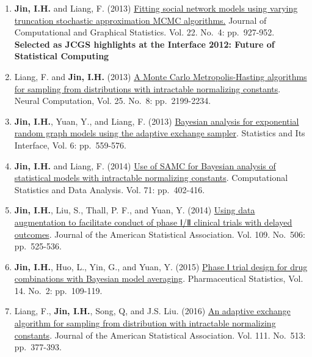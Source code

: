 \documentclass[
]{book}
\begin{document}
\begin{enumerate}
\def\labelenumi{\arabic{enumi}.}
\item
  \textbf{Jin, I.H.} and Liang, F. (2013) \href{https://www.researchgate.net/publication/241724330_Fitting_Social_Network_Models_Using_Varying_Truncation_Stochastic_Approximation_MCMC_Algorithm}{Fitting social network models using varying truncation stochastic approximation MCMC algorithms.} Journal of Computational and Graphical Statistics. Vol. 22. No.~4: pp.~927-952. \textbf{Selected as JCGS highlights at the Interface 2012: Future of Statistical Computing}
\item
  Liang, F. and \textbf{Jin, I.H.} (2013) \href{https://www.researchgate.net/publication/236264661_A_Monte_Carlo_Metropolis-Hastings_Algorithm_for_Sampling_from_Distributions_with_Intractable_Normalizing_Constants}{A Monte Carlo Metropolis-Hasting algorithms for sampling from distributions with intractable normalizing constants}. Neural Computation, Vol. 25. No.~8: pp.~2199-2234.
\item
  \textbf{Jin, I.H.}, Yuan, Y., and Liang, F. (2013) \href{https://www.researchgate.net/publication/260999601_Bayesian_Analysis_for_Exponential_Random_Graph_Models_Using_the_Adaptive_Exchange_Sampler}{Bayesian analysis for exponential random graph models using the adaptive exchange sampler}. Statistics and Its Interface, Vol. 6: pp.~559-576.
\item
  \textbf{Jin, I.H.} and Liang, F. (2014) \href{https://www.researchgate.net/publication/228682695_Use_of_SAMC_for_Bayesian_Analysis_of_Statistical_Models_with_Intractable_Normalizing_Constants}{Use of SAMC for Bayesian analysis of statistical models with intractable normalizing constants}. Computational Statistics and Data Analysis. Vol. 71: pp.~402-416.
\item
  \textbf{Jin, I.H.}, Liu, S., Thall, P. F., and Yuan, Y. (2014) \href{https://pubmed.ncbi.nlm.nih.gov/25382884/}{Using data augmentation to facilitate conduct of phase Ⅰ/Ⅱ clinical trials with delayed outcomes}. Journal of the American Statistical Association. Vol. 109. No.~506: pp.~525-536.
\item
  \textbf{Jin, I.H.}, Huo, L., Yin, G., and Yuan, Y. (2015) \href{https://pubmed.ncbi.nlm.nih.gov/25641851/}{Phase Ⅰ trial design for drug combinations with Bayesian model averaging}. Pharmaceutical Statistics, Vol. 14. No.~2: pp.~109-119.
\item
  Liang, F., \textbf{Jin, I.H.}, Song, Q, and J.S. Liu. (2016) \href{https://www.researchgate.net/publication/272376704_An_Adaptive_Exchange_Algorithm_for_Sampling_From_Distributions_With_Intractable_Normalizing_Constants}{An adaptive exchange algorithm for sampling from distribution with intractable normalizing constants}. Journal of the American Statistical Association. Vol. 111. No.~513: pp.~377-393.

\end{enumerate}
\end{document}
